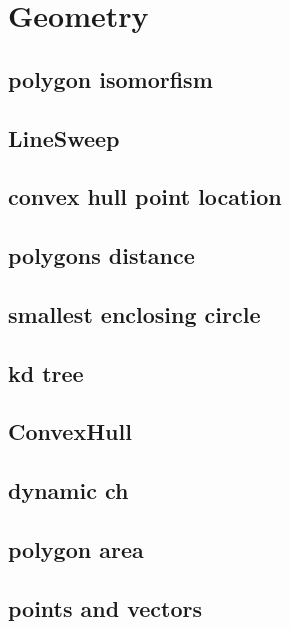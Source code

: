 \section{Geometry}
\subsection{polygon isomorfism}
\raggedbottom
\hrulefill
\subsection{LineSweep}
\raggedbottom
\hrulefill
\subsection{convex hull point location}
\raggedbottom
\hrulefill
\subsection{polygons distance}
\raggedbottom
\hrulefill
\subsection{smallest enclosing circle}
\raggedbottom
\hrulefill
\subsection{kd tree}
\raggedbottom
\hrulefill
\subsection{ConvexHull}
\raggedbottom
\hrulefill
\subsection{dynamic ch}
\raggedbottom
\hrulefill
\subsection{polygon area}
\raggedbottom
\hrulefill
\subsection{points and vectors}
\raggedbottom
\hrulefill
